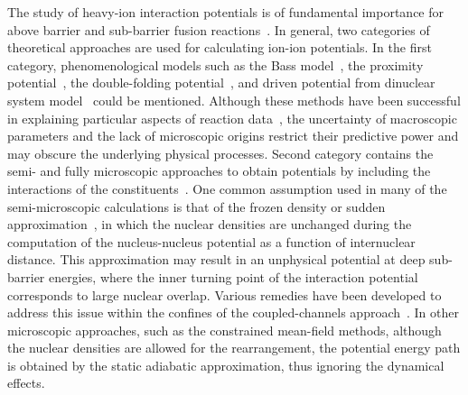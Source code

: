 The study of heavy-ion interaction potentials is of fundamental importance for above barrier and sub-barrier fusion reactions~\citep{Back2014_RMP86-317}.
In general, two categories of theoretical approaches are used for
calculating ion-ion potentials. In the first category, phenomenological models such as the Bass model~\citep{Bass1974_NPA231-45}, the proximity potential~\citep{Randrup1978_PLB77-170,Seiwert1984_PRC29-477}, the double-folding potential~\citep{Satchler1979_PR55-183,Rhoades-Brown1983_PRL50-1435}, and driven potential from dinuclear system model~\citep{Adamian2004_PRC69-044601,
	Wang2012_PRC85-041601,Zhu2016_PRC93-064610,Bao2016_PRC93-044615,Feng2018_PRC95-024615} could be mentioned.
Although these methods have been successful in explaining particular aspects of reaction
data~\citep{Randrup1978_NPA307-319,Fazio2004_EPJA19-89}, the uncertainty of macroscopic parameters and the lack of microscopic origins restrict their predictive power and may obscure the underlying physical processes.
Second category contains the semi- and fully microscopic approaches to obtain potentials by including the interactions of the constituents~\citep{Moller2004_PRL92-072501,Guo2004_NPA740-59,Guo2005_PRC71-024315,Guo2007_PRC76-034317,Lu2014_PRC89-014323}.
One common  assumption used in many of the semi-microscopic calculations is that of the frozen density or sudden approximation~\citep{Brueckner1968_PR173-944}, in which the nuclear densities are unchanged during the computation of the nucleus-nucleus potential as a function of internuclear distance.
This approximation may result in an unphysical potential at deep sub-barrier energies, where the inner turning point of the interaction potential corresponds to large nuclear overlap.
Various remedies have been developed to address this issue within the confines of the coupled-channels approach~\citep{Misicu2006_PRL96-112701,Ichikawa2007_PRC75-057603}.
In other microscopic approaches, such as the constrained mean-field methods, although the nuclear densities are allowed for the rearrangement, the potential energy path is obtained by the static adiabatic approximation, thus ignoring the dynamical effects.

